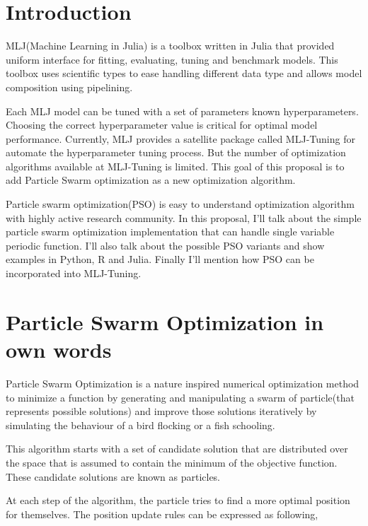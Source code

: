 \documentclass{article}
\begin{document}

\pagebreak

\tableofcontents
\pagebreak

\section{Introduction}

MLJ(Machine Learning in Julia) is a toolbox written in Julia that provided uniform interface for fitting, evaluating, tuning and benchmark models. This toolbox uses scientific types to ease handling different data type and allows model composition using pipelining.

Each MLJ model can be tuned with a set of parameters known hyperparameters. Choosing the correct hyperparameter value is critical for optimal model performance. Currently, MLJ provides a satellite package called MLJ-Tuning for automate the hyperparameter tuning process. But the number of optimization algorithms available at MLJ-Tuning is limited. This goal of this proposal is to add Particle Swarm optimization as a new optimization algorithm.

Particle swarm optimization(PSO) is easy to understand optimization algorithm with highly active research community. In this proposal, I'll talk about the simple particle swarm optimization implementation that can handle single variable periodic function. I'll also talk about the possible PSO variants and show examples in Python, R and Julia. Finally I'll mention how PSO can be incorporated into MLJ-Tuning.

\section{Particle Swarm Optimization in own words}

Particle Swarm Optimization is a nature inspired numerical optimization method to minimize a function by generating and manipulating a swarm of particle(that represents possible solutions) and improve those solutions iteratively by simulating the behaviour of a bird flocking or a fish schooling.

This algorithm starts with a set of candidate solution that are distributed over the space that is assumed to contain the minimum of the objective function. These candidate solutions are known as particles.

At each step of the algorithm, the particle tries to find a more optimal position for themselves. The position update rules can be expressed as following,
\end{document}
